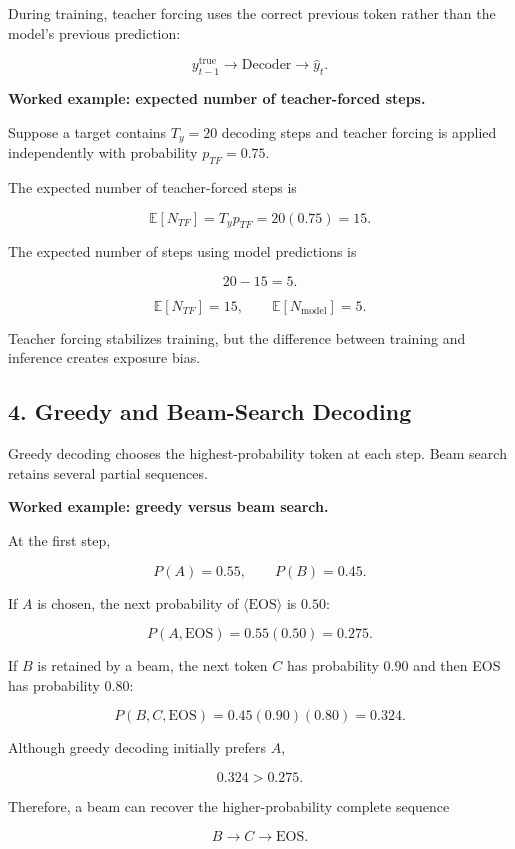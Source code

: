 \documentclass[11pt,a4paper,twoside]{article}
\newcommand{\E}{\mathbb{E}}
\begin{document}
During training, teacher forcing uses the correct previous token rather than the model's previous prediction:

\[
y_{t-1}^{\mathrm{true}}\rightarrow\text{Decoder}\rightarrow\hat y_t.
\]

\textbf{Worked example: expected number of teacher-forced steps.}

Suppose a target contains $T_y=20$ decoding steps and teacher forcing is applied independently with probability $p_{TF}=0.75$.

The expected number of teacher-forced steps is

\[
\E[N_{TF}]=T_yp_{TF}=20(0.75)=15.
\]

The expected number of steps using model predictions is

\[
20-15=5.
\]

\[
\boxed{\E[N_{TF}]=15,\qquad\E[N_{\mathrm{model}}]=5.}
\]

Teacher forcing stabilizes training, but the difference between training and inference creates exposure bias.

\subsection*{4. Greedy and Beam-Search Decoding}

Greedy decoding chooses the highest-probability token at each step. Beam search retains several partial sequences.

\textbf{Worked example: greedy versus beam search.}

At the first step,

\[
P(A)=0.55,
\qquad
P(B)=0.45.
\]

If $A$ is chosen, the next probability of $\langle\mathrm{EOS}\rangle$ is $0.50$:

\[
P(A,\mathrm{EOS})=0.55(0.50)=0.275.
\]

If $B$ is retained by a beam, the next token $C$ has probability $0.90$ and then EOS has probability $0.80$:

\[
P(B,C,\mathrm{EOS})=0.45(0.90)(0.80)=0.324.
\]

Although greedy decoding initially prefers $A$,

\[
0.324>0.275.
\]

Therefore, a beam can recover the higher-probability complete sequence

\[
\boxed{B\rightarrow C\rightarrow\mathrm{EOS}.}
\]

\end{document}
